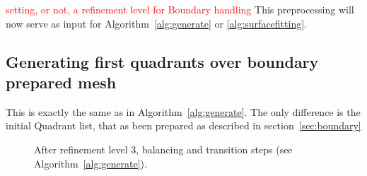\documentclass[10pt]{article}
\begin{document}
\textcolor{red}{setting, or not, a refinement level for Boundary handling}
This preprocessing will now serve as input for Algorithm~\ref{alg:generate} or \ref{alg:surfacefitting}. 


\subsection{Generating first quadrants over boundary prepared mesh}
This is exactly the same as in Algorithm~\ref{alg:generate}. The only difference is the initial Quadrant list, that as been prepared as described in section~\ref{sec:boundary}

\begin{figure}[htb]
\centering
 \caption{After refinement level 3, balancing and transition steps (see Algorithm~\ref{alg:generate}).}
\label{fig:generate3}
\end{figure}
\end{document}
